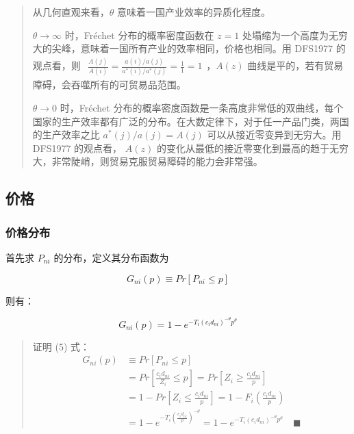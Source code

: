 \documentclass[
]{article}
\begin{document}
\begin{quote}
从几何直观来看，\(\theta\) 意味着一国产业效率的异质化程度。

\(\theta \rightarrow \infty\) 时，Fréchet 分布的概率密度函数在 \(z=1\) 处塌缩为一个高度为无穷大的尖峰，意味着一国所有产业的效率相同，价格也相同。用 DFS1977 的观点看，则 \(\begin{aligned} \frac{A(j)}{A(i)}=\frac{a(i)/a(j)}{a^\ast(i)/a^\ast(j)}=\frac{1}{1}=1 \end{aligned}\)，\(A(z)\) 曲线是平的，若有贸易障碍，会吞噬所有的可贸易品范围。

\(\theta \rightarrow 0\) 时，Fréchet 分布的概率密度函数是一条高度非常低的双曲线，每个国家的生产效率都有广泛的分布。在大数定律下，对于任一产品门类，两国的生产效率之比 \(a^\ast(j)/a(j)=A(j)\) 可以从接近零变异到无穷大。用 DFS1977 的观点看， \(A(z)\) 的变化从最低的接近零变化到最高的趋于无穷大，非常陡峭，则贸易克服贸易障碍的能力会非常强。
\end{quote}

\hypertarget{ux4ef7ux683c}{%
\subsection{价格}\label{ux4ef7ux683c}}

\hypertarget{ux4ef7ux683cux5206ux5e03}{%
\subsubsection{价格分布}\label{ux4ef7ux683cux5206ux5e03}}

首先求 \(P_{ni}\) 的分布，定义其分布函数为

\[
G_{ni}(p) \equiv Pr[P_{ni} \le p]  
\]

则有：

\[
G_{ni}(p) =1-e^{-T_{i} ( {{c_i}d_{ni}})^{-\theta}p^{\theta}} \tag{5}
\]

\begin{quote}
证明 (5) 式：
\[
\begin{aligned}
G_{ni}(p) & \equiv Pr[P_{ni} \le p] \\  
&= Pr[\frac {{c_i}d_{ni}}{Z_i} \le p]  = Pr[Z_i \geq \frac {{c_i}d_{ni}}{p}] \\ & = 1-Pr[Z_i \le \frac {{c_i}d_{ni}}{p}] = 1 - F_i(\frac {{c_i}d_{ni}}{p}) \\  
&= 1 - e^{-T_{i} (\frac {{c_i}d_{ni}}{p})^{-\theta}} = 1-e^{-T_{i} ( {{c_i}d_{ni}})^{-\theta}p^{\theta}} \quad \blacksquare 
\end{aligned}
\]
\end{quote}
\end{document}
